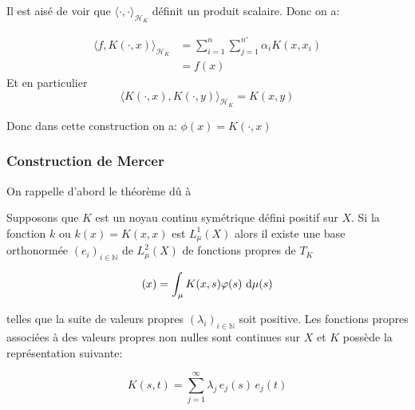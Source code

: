 Il est aisé de voir que $\langle \cdot , \cdot \rangle_{\mathcal{H}_K}$ définit un produit scalaire. Donc on a:

\begin{align*}
    \langle f , K(\cdot,x) \rangle_{\mathcal{H}_K} &= \sum_{i=1}^n \sum_{j=1}^{n'} \alpha_i K(x,x_i) \\
    &=  f(x)
\end{align*}
Et en particulier
\begin{equation*}
    \langle K(\cdot,x) , K(\cdot,y) \rangle_{\mathcal{H}_K} =  K(x,y)
\end{equation*}

Donc dans cette construction on a: $\phi (x) = K(\cdot,x)$

\subsubsection{Construction de Mercer}

On rappelle d'abord le théorème dû à \citet{Mercer}

\begin{theoreme}
Supposons que $K$ est un noyau continu symétrique défini positif sur $X$. Si la fonction $k$ ou $k(x) = K(x,x)$ est $L^1_\mu (X)$ alors il existe une base orthonormée $(e_i)_{i\in \mathbb{N}}$ de $L^2_{\mu} (X)$ de fonctions propres de $T_K$

\begin{equation*}
    [T_K \varphi](x) =\int_\mu  K(x,s) \varphi(s)\, \diff \mu (s)
\end{equation*}
 
telles que la suite de valeurs propres $(\lambda_i)_{i \in \mathbb{N}}$ soit positive. Les fonctions propres associées à des valeurs propres non nulles sont continues sur $X$ et $K$ possède la représentation suivante:

\begin{equation*}
    K(s,t) = \sum_{j=1}^\infty \lambda_j \, e_j(s) \, e_j(t)
\end{equation*}
\end{theoreme}

